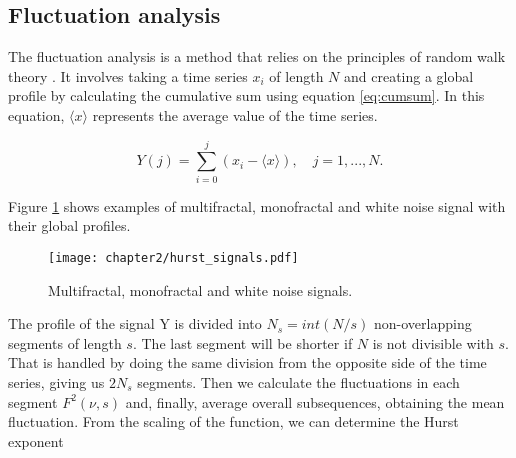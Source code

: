


\subsection{Fluctuation analysis}

The fluctuation analysis is a method that relies on the principles of random walk theory \cite{kantelhardt2008fractal}. It involves taking a time series ${x_i}$ of length $N$ and creating a global profile by calculating the cumulative sum using equation \ref{eq:cumsum}. In this equation, $\langle x\rangle $ represents the average value of the time series.


\begin{equation}
Y(j) = \sum_{i=0} ^j (x_i - \langle x\rangle), \quad j=1, ..., N .
\label{eq:cumsum}
\end{equation}

Figure \ref{fig:hurst_signals} shows examples of multifractal, monofractal and white noise signal with their global profiles.

\begin{figure}[h]
	\centering
	\texttt{[image: chapter2/hurst\_signals.pdf]}
	\caption{Multifractal, monofractal and white noise signals.}
	\label{fig:hurst_signals}
\end{figure}

The profile of the signal Y is divided into $N_s = int (N/s)$ non-overlapping segments of length $s$. The last segment will be shorter if $N$ is not divisible with $s$. That is handled by doing the same division from the opposite side of the time series, giving us $2N_s$ segments. Then we calculate the fluctuations in each segment $F^2(\nu, s)$ and, finally, average overall subsequences, obtaining the mean fluctuation. From the scaling of the function, we can determine the Hurst exponent

